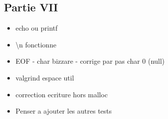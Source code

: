 \documentclass{article}
\begin{document}
\subsection{Partie VII}
\begin{itemize}
    \item echo ou printf
    \item \textbackslash n fonctionne
    \item EOF - char bizzare - corrige par pas char 0 (null)
    \item valgrind espace util 
    \item correction ecriture hors malloc
    \item Penser a ajouter les autres tests
\end{itemize}
\end{document}
